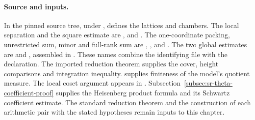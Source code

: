 \paragraph{Source and inputs.}
In the pinned source tree, under
,
 defines the lattices and chambers.
The local separation and the square estimate are
,
 and .
The one-coordinate packing, unrestricted sum, minor and full-rank
sum are , ,
 and
. The two global estimates are
 and ,
assembled in . These names combine the identifying
file with the declaration. The imported reduction theorem
 supplies the cover,
height comparisons and integration inequality.
 supplies finiteness of the
model's quotient measure. The local coset argument appears in .
Subsection~\ref{subsec:sr-theta-coefficient-proof} supplies the
Heisenberg product formula and its Schwartz coefficient estimate.
The standard reduction theorem and the construction of each arithmetic
pair with the stated hypotheses remain inputs to this chapter.
